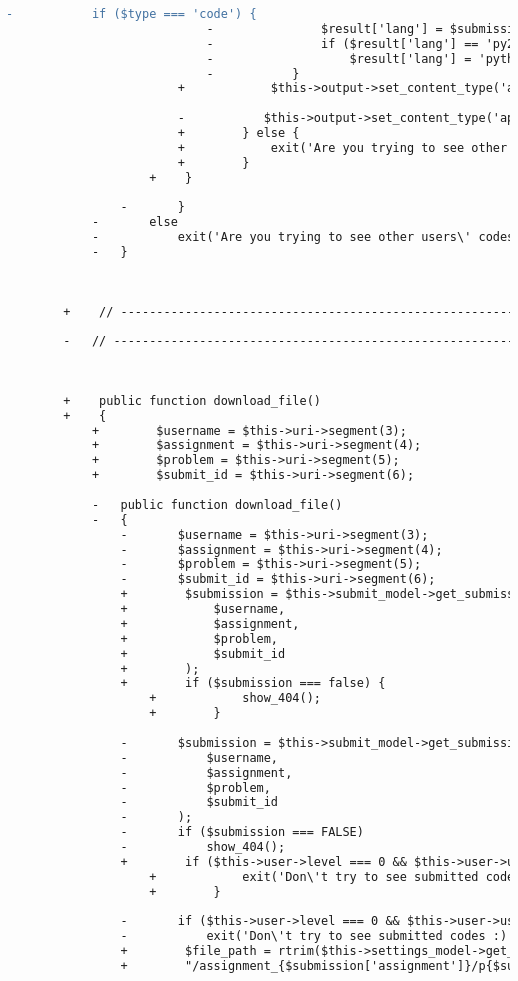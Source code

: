 \begin{lstlisting}[language=diff, caption=Perubahan pada kode Submissions.php]
						-			if ($type === 'code') {
							-				$result['lang'] = $submission['file_type'];
							-				if ($result['lang'] == 'py2' || $result['lang'] == 'py3')
							-					$result['lang'] = 'python';
							-			}
						+            $this->output->set_content_type('application/json')->set_output(json_encode($result));
						
						-			$this->output->set_content_type('application/json')->set_output(json_encode($result));
						+        } else {
						+            exit('Are you trying to see other users\' codes? :)');
						+        }
					+    }
				
				-		}
			-		else
			-			exit('Are you trying to see other users\' codes? :)');
			-	}
		
		
		
		+    // ------------------------------------------------------------------------
		
		-	// ------------------------------------------------------------------------
		
		
		
		+    public function download_file()
		+    {
			+        $username = $this->uri->segment(3);
			+        $assignment = $this->uri->segment(4);
			+        $problem = $this->uri->segment(5);
			+        $submit_id = $this->uri->segment(6);
			
			-	public function download_file()
			-	{
				-		$username = $this->uri->segment(3);
				-		$assignment = $this->uri->segment(4);
				-		$problem = $this->uri->segment(5);
				-		$submit_id = $this->uri->segment(6);
				+        $submission = $this->submit_model->get_submission(
				+            $username,
				+            $assignment,
				+            $problem,
				+            $submit_id
				+        );
				+        if ($submission === false) {
					+            show_404();
					+        }
				
				-		$submission = $this->submit_model->get_submission(
				-			$username,
				-			$assignment,
				-			$problem,
				-			$submit_id
				-		);
				-		if ($submission === FALSE)
				-			show_404();
				+        if ($this->user->level === 0 && $this->user->username != $submission['username']) {
					+            exit('Don\'t try to see submitted codes :)');
					+        }
				
				-		if ($this->user->level === 0 && $this->user->username != $submission['username'])
				-			exit('Don\'t try to see submitted codes :)');
				+        $file_path = rtrim($this->settings_model->get_setting('assignments_root'), '/').
				+        "/assignment_{$submission['assignment']}/p{$submission['problem']}/{$submission['username']}/{$submission['file_name']}.".filetype_to_extension($submission['file_type']);
				

\end{lstlisting}
